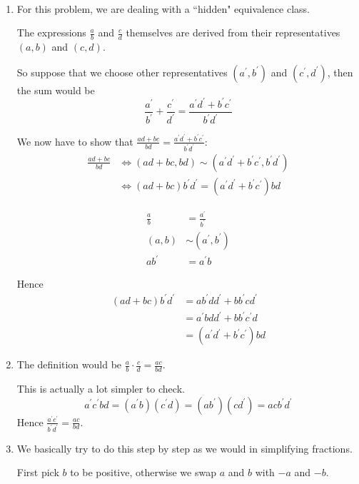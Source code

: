 \begin{solution} \ 
\begin{enumerate}[label=(\alph*)]
\item For this problem, we are dealing with a ``hidden" equivalence class.

The expressions $\frac{a}{b}$ and $\frac{c}{d}$ themselves are derived from their representatives $(a,b)$ and $(c,d)$.

So suppose that we choose other representatives $(a^\prime,b^\prime)$ and $(c^\prime,d^\prime)$, then the sum would be
\[ \frac{a^\prime}{b^\prime} + \frac{c^\prime}{d^\prime} = \frac{a^\prime d^\prime + b^\prime c^\prime}{b^\prime d^\prime} \]

We now have to show that $\frac{ad+bc}{bd} = \frac{a^\prime d^\prime + b^\prime c^\prime}{b^\prime d^\prime}$:
\begin{align*}
\frac{ad+bc}{bd} 
&\iff (ad+bc,bd) \sim (a^\prime d^\prime+b^\prime c^\prime,b^\prime d^\prime) \\
&\iff (ad+bc)b^\prime d^\prime =(a^\prime d^\prime+b^\prime c^\prime)bd
\end{align*}

\begin{align*}
\frac{a}{b} &= \frac{a^\prime}{b^\prime} \\
(a,b) &\sim (a^\prime,b^\prime) \\
ab^\prime &= a^\prime b
\end{align*}

Hence
\begin{align*}
(ad+bc)b^\prime d^\prime
&= ab^\prime dd^\prime + bb^\prime cd^\prime \\
&= a^\prime bdd^\prime + bb^\prime c^\prime d \\
&= (a^\prime d^\prime + b^\prime c^\prime )bd
\end{align*}

\item The definition would be $\frac{a}{b} \cdot \frac{c}{d} = \frac{ac}{bd}$.

This is actually a lot simpler to check.
\[ a^\prime c^\prime bd=(a^\prime b)(c^\prime d)=(ab^\prime)(cd^\prime)=acb^\prime d^\prime \]
Hence $\frac{a^\prime c^\prime}{b^\prime d^\prime} = \frac{ac}{bd}$.

\item We basically try to do this step by step as we would in simplifying fractions.

First pick $b$ to be positive, otherwise we swap $a$ and $b$ with $-a$ and $-b$.


\end{enumerate}
\end{solution}
